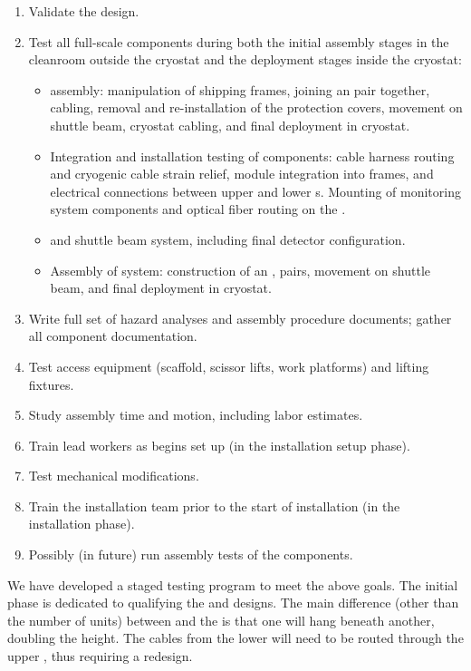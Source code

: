 \begin{enumerate}
\item Validate the  design. 
\item Test all full-scale  components during both the initial assembly stages in the cleanroom outside the cryostat and the deployment stages inside the cryostat:  
\begin{itemize}
    \item {}  assembly: manipulation of  shipping frames, joining an  pair together,  cabling, removal and re-installation of the  protection covers, movement on shuttle beam, cryostat cabling, and final deployment in cryostat. 
    \item Integration and installation testing of  components: cable harness routing and cryogenic cable strain relief, module integration into  frames, and electrical connections between upper and lower s.   Mounting of  monitoring system components and optical fiber routing on the . %
    \item {} and shuttle beam system, including final detector configuration.
    \item Assembly of  system: construction of an , %
     pairs, movement on shuttle beam, and final deployment in cryostat.
\end{itemize}
\item Write full set of hazard analyses and assembly procedure documents; %
gather all component documentation. 
\item Test access equipment (scaffold, scissor lifts, work platforms) and lifting fixtures. 
\item Study assembly time and motion, including labor estimates. 
\item Train lead workers as  begins set up (in the installation setup phase).
\item Test mechanical modifications.
\item Train the installation team prior to the start of  installation (in the installation phase). 
\item Possibly (in future) run assembly tests of the  components.
\end{enumerate}

We have developed a staged testing program to meet the above goals.  The initial phase is dedicated to qualifying the  and  designs. The main difference (other than the number of units) between  and the   is that one  will hang beneath another, doubling the height. The cables from the lower  will need to be routed through the upper , thus requiring a redesign. 

